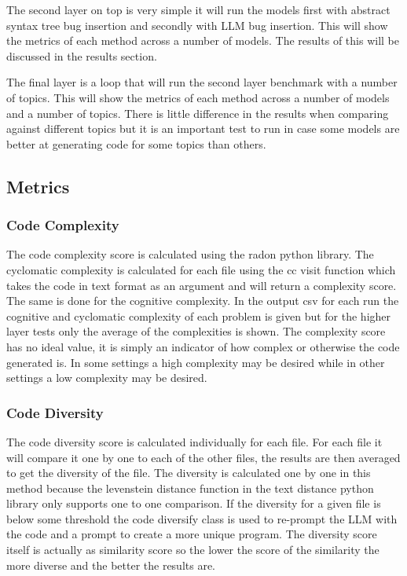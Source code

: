 \documentclass[12pt]{extarticle}
\begin{document}
The second layer on top is very simple it will run the models first with abstract syntax tree bug insertion and secondly with LLM bug insertion. This will show the metrics of each method across a number of models. The results of this will be discussed in the results section.

The final layer is a loop that will run the second layer benchmark with a number of topics. This will show the metrics of each method across a number of models and a number of topics. There is little difference in the results when comparing against different topics but it is an important test to run in case some models are better at generating code for some topics than others.

\subsection{Metrics}
\subsubsection{Code Complexity}

The code complexity score is calculated using the radon python library. The cyclomatic complexity is calculated for each file using the cc visit function which takes the code in text format as an argument and will return a complexity score. The same is done for the cognitive complexity. In the output csv for each run the cognitive and cyclomatic complexity of each problem is given but for the higher layer tests only the average of the complexities is shown. The complexity score has no ideal value, it is simply an indicator of how complex or otherwise the code generated is. In some settings a high complexity may be desired while in other settings a low complexity may be desired.

\subsubsection{Code Diversity}

The code diversity score is calculated individually for each file. For each file it will compare it one by one to each of the other files, the results are then averaged to get the diversity of the file. The diversity is calculated one by one in this method because the levenstein distance function in the text distance python library only supports one to one comparison. If the diversity for a given file is below some threshold the code diversify class is used to re-prompt the LLM with the code and a prompt to create a more unique program. The diversity score itself is actually as similarity score so the lower the score of the similarity the more diverse and the better the results are.
\end{document}

